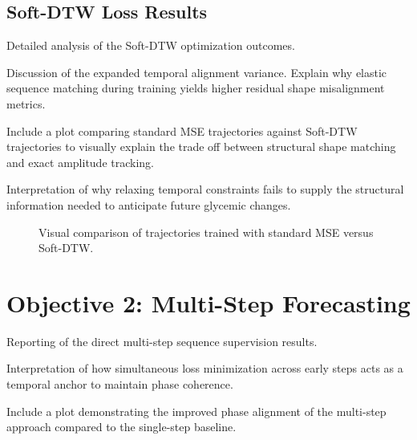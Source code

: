 \subsection{Soft-DTW Loss Results}
\begin{planned}
    \item Detailed analysis of the Soft-DTW optimization outcomes.
    \item Discussion of the expanded temporal alignment variance. Explain why elastic sequence matching during training yields higher residual shape misalignment metrics.
    \item Include a plot comparing standard MSE trajectories against Soft-DTW trajectories to visually explain the trade off between structural shape matching and exact amplitude tracking.
    \item Interpretation of why relaxing temporal constraints fails to supply the structural information needed to anticipate future glycemic changes.
\end{planned}

\begin{figure}[H]
    \centering
    \caption{Visual comparison of trajectories trained with standard MSE versus Soft-DTW.}
    \label{fig:exp:soft_dtw_plot}
\end{figure}

\section{Objective 2: Multi-Step Forecasting} \label{sec:exp:obj2}
\begin{planned}
    \item Reporting of the direct multi-step sequence supervision results.
    \item Interpretation of how simultaneous loss minimization across early steps acts as a temporal anchor to maintain phase coherence.
    \item Include a plot demonstrating the improved phase alignment of the multi-step approach compared to the single-step baseline.
\end{planned}

